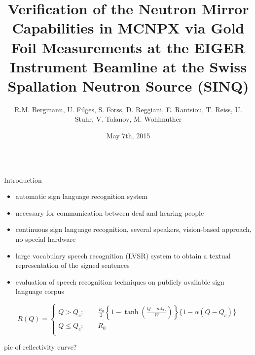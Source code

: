 \documentclass[final,t]{beamer}
\title{\huge Verification of the Neutron Mirror Capabilities in MCNPX via Gold Foil Measurements at the EIGER Instrument Beamline at the Swiss Spallation Neutron Source (SINQ) } %
\author{R.M. Bergmann, U. Filges, S. Forss, D. Reggiani, E. Rantsiou, T. Reiss, U. Stuhr, V. Talanov, M. Wohlmuther} %
\institute[PSI]{Paul Scherrer Institut, Villigen, Switzerland}
\date[May 7th, 2015]{May 7th, 2015}
\begin{document}
\begin{frame}{} 
  \begin{columns}[t]
    \begin{column}{.3\linewidth}


      \begin{block}{Introduction}
        \begin{itemize}
        \item automatic sign language recognition system                                    %
        \item \alert{necessary for communication} between deaf and
          hearing people
        \item \alert{continuous} sign language recognition,
          \alert{several} speakers, \alert{vision-based} approach, \alert{no
            special hardware}
        \item large vocabulary speech recognition (LVSR) system to
          obtain a textual representation of the signed
          sentences 
        \item evaluation of speech recognition techniques on \alert{publicly
          available sign language
          corpus}
        \end{itemize}

        \begin{equation}\label{eq:ref}
            R(Q) = 
            \begin{cases}
                Q > Q_c;  \qquad \frac{R_0}{2}\left\{  1 - \tanh\left(  \frac{Q - m Q_c}{W}\right) \right\}\{1-\alpha(Q-Q_c)\} \\
                Q \leq Q_c; \qquad R_0 \\
            \end{cases}
        \end{equation}

        pic of reflectivity curve?

      \end{block}

      

\end{column}
\end{columns}
\end{frame}
\end{document}
